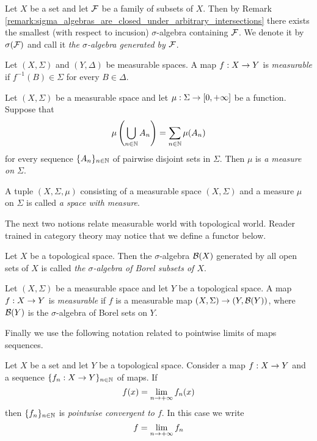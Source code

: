 \begin{remark}\label{remark:sigma_algebra_generated_by_family}
    Let $X$ be a set and let ${\mathcal F}$ be a family of subsets of $X$. Then by Remark \ref{remark:sigma_algebras_are_closed_under_arbitrary_intersections} there exists the smallest (with respect to incusion) $\sigma$-algebra containing ${\mathcal F}$. We denote it by $\sigma({\mathcal F})$ and call it \textit{the $\sigma$-algebra generated by ${\mathcal F}$}.  
\end{remark}

\begin{definition}
    Let $(X,\Sigma)$ and $(Y,\Delta)$ be measurable spaces. A map $f:X\rightarrow Y$ is \textit{measurable} if $f^{-1}(B)\in \Sigma$ for every $B\in \Delta$.
\end{definition}

\begin{definition}
    Let $(X,\Sigma)$ be a measurable space and let $\mu:\Sigma \rightarrow [0,+\infty]$ be a function. Suppose that
    $$\mu\left(\bigcup_{n \in {\mathbb N}}A_n\right) = \sum_{n\in {\mathbb N}}\mu(A_n)$$
    for every sequence $\{A_n\}_{n\in {\mathbb N}}$ of pairwise disjoint sets in $\Sigma$. Then $\mu$ is \textit{a measure on $\Sigma$}.
\end{definition}

\begin{definition}
    A tuple $(X,\Sigma,\mu)$ consisting of a measurable space $\left(X,\Sigma\right)$ and a measure $\mu$ on $\Sigma$ is called \textit{a space with measure}.
\end{definition}
\noindent
The next two notions relate measurable world with topological world. Reader trained in category theory may notice that we define a functor below.

\begin{definition}
    Let $X$ be a topological space. Then the $\sigma$-algebra ${\mathcal B}(X)$ generated by all open sets of $X$ is called \textit{the $\sigma$-algebra of Borel subsets of $X$}.
\end{definition}

\begin{definition}
    Let $(X,\Sigma)$ be a measurable space and let $Y$ be a topological space. A map $f:X\rightarrow Y$ is \textit{measurable} if $f$ is a measurable map $(X,\Sigma)\rightarrow (Y,{\mathcal B}(Y))$, where ${\mathcal B}(Y)$ is the $\sigma$-algebra of Borel sets on $Y$.
\end{definition}
\noindent
Finally we use the following notation related to pointwise limits of maps sequences.

\begin{definition}
    Let $X$ be a set and let $Y$ be a topological space. Consider a map $f:X\rightarrow Y$ and a sequence $\{f_n:X\rightarrow Y\}_{n\in {\mathbb N}}$ of maps. If
    $$f(x) = \lim_{n\rightarrow +\infty}f_n(x)$$
    then $\{f_n\}_{n\in {\mathbb N}}$ is \textit{pointwise convergent to $f$}. In this case we write
    $$f = \lim_{n\rightarrow +\infty}f_n$$
\end{definition}

